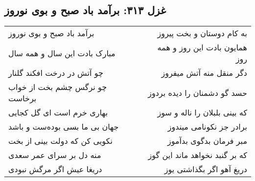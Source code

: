 \begin{center}
\section*{غزل ۳۱۳: برآمد باد صبح و بوی نوروز}
\label{sec:313}
\begin{longtable}{l p{0.5cm} r}
برآمد باد صبح و بوی نوروز
&&
به کام دوستان و بخت پیروز
\\
مبارک بادت این سال و همه سال
&&
همایون بادت این روز و همه روز
\\
چو آتش در درخت افکند گلنار
&&
دگر منقل منه آتش میفروز
\\
چو نرگس چشم بخت از خواب برخاست
&&
حسد گو دشمنان را دیده بردوز
\\
بهاری خرم است ای گل کجایی
&&
که بینی بلبلان را ناله و سوز
\\
جهان بی ما بسی بوده‌ست و باشد
&&
برادر جز نکونامی میندوز
\\
نکویی کن که دولت بینی از بخت
&&
مبر فرمان بدگوی بدآموز
\\
منه دل بر سرای عمر سعدی
&&
که بر گنبد نخواهد ماند این گوز
\\
دریغا عیش اگر مرگش نبودی
&&
دریغ آهو اگر بگذاشتی یوز
\\
\end{longtable}
\end{center}
